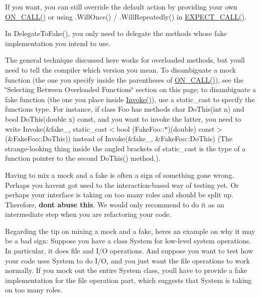 \begin{DoxyItemize}
\item If you want, you can still override the default action by providing your own {\ttfamily \hyperlink{gmock-spec-builders_8h_a5b12ae6cf84f0a544ca811b380c37334}{O\+N\+\_\+\+C\+A\+L\+L()}} or using {\ttfamily .Will\+Once()} / {\ttfamily .Will\+Repeatedly()} in {\ttfamily \hyperlink{gmock-spec-builders_8h_a535a6156de72c1a2e25a127e38ee5232}{E\+X\+P\+E\+C\+T\+\_\+\+C\+A\+L\+L()}}.
\item In {\ttfamily Delegate\+To\+Fake()}, you only need to delegate the methods whose fake implementation you intend to use.
\item The general technique discussed here works for overloaded methods, but you\textquotesingle{}ll need to tell the compiler which version you mean. To disambiguate a mock function (the one you specify inside the parentheses of {\ttfamily \hyperlink{gmock-spec-builders_8h_a5b12ae6cf84f0a544ca811b380c37334}{O\+N\+\_\+\+C\+A\+L\+L()}}), see the \char`\"{}\+Selecting Between Overloaded Functions\char`\"{} section on this page; to disambiguate a fake function (the one you place inside {\ttfamily \hyperlink{namespacetesting_a12aebaf8363d49a383047529f798b694}{Invoke()}}), use a {\ttfamily static\+\_\+cast} to specify the function\textquotesingle{}s type. For instance, if class {\ttfamily Foo} has methods {\ttfamily char Do\+This(int n)} and {\ttfamily bool Do\+This(double x) const}, and you want to invoke the latter, you need to write {\ttfamily Invoke(\&fake\+\_\+, static\+\_\+cast$<$bool (Fake\+Foo\+:\+:$\ast$)(double) const$>$(\&Fake\+Foo\+::\+Do\+This))} instead of {\ttfamily Invoke(\&fake\+\_\+, \&\+Fake\+Foo\+::\+Do\+This)} (The strange-\/looking thing inside the angled brackets of {\ttfamily static\+\_\+cast} is the type of a function pointer to the second {\ttfamily Do\+This()} method.).
\item Having to mix a mock and a fake is often a sign of something gone wrong. Perhaps you haven\textquotesingle{}t got used to the interaction-\/based way of testing yet. Or perhaps your interface is taking on too many roles and should be split up. Therefore, {\bfseries don\textquotesingle{}t abuse this}. We would only recommend to do it as an intermediate step when you are refactoring your code.
\end{DoxyItemize}

Regarding the tip on mixing a mock and a fake, here\textquotesingle{}s an example on why it may be a bad sign\+: Suppose you have a class {\ttfamily System} for low-\/level system operations. In particular, it does file and I/O operations. And suppose you want to test how your code uses {\ttfamily System} to do I/O, and you just want the file operations to work normally. If you mock out the entire {\ttfamily System} class, you\textquotesingle{}ll have to provide a fake implementation for the file operation part, which suggests that {\ttfamily System} is taking on too many roles.

